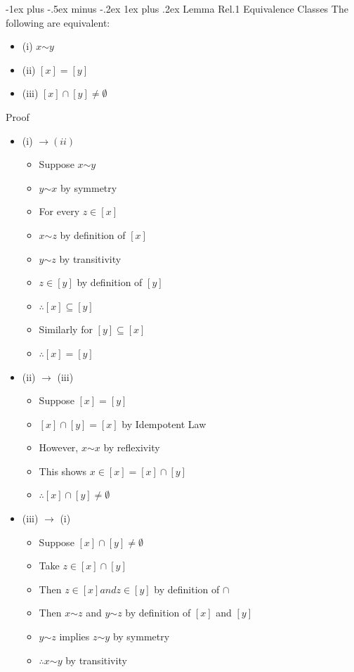 \documentclass[10pt, portrait]{article}
\makeatletter
\renewcommand{\subsection}{\@startsection{subsection}{3}{0mm}%
                                {-1ex plus -.5ex minus -.2ex}%
                                {1ex plus .2ex}%
                                {\normalfont\small\bfseries}}%
\renewcommand{\lnot}{\mathord{\sim}}
\makeatother
\begin{document}
\begin{multicols*}{2}
\subsection{Lemma Rel.1 Equivalence Classes}
The following are equivalent:
\begin{itemize}
    \item (i) $x \lnot y$
    \item (ii) $[x] = [y]$
    \item (iii) $[x] \cap [y] \neq \emptyset$
\end{itemize}
Proof
\begin{itemize}
    \item (i) $\rightarrow (ii)$
    \begin{itemize}
        \item Suppose $x \lnot y$
        \item $y \lnot x$ by symmetry
        \item For every $z \in [x]$
        \item $x \lnot z$ by definition of $[x]$
        \item $y \lnot z$ by transitivity
        \item $z \in [y]$ by definition of $[y]$
        \item $\therefore [x] \subseteq [y]$
        \item Similarly for $[y] \subseteq [x]$
        \item $\therefore [x] = [y]$
    \end{itemize}
    \item (ii) $\rightarrow$ (iii)
    \begin{itemize}
        \item Suppose $[x] = [y]$
        \item $[x] \cap [y] = [x]$ by Idempotent Law
        \item However, $x \lnot x$ by reflexivity
        \item This shows $x \in [x] = [x] \cap [y]$
        \item $\therefore [x] \cap [y] \neq \emptyset$
    \end{itemize}
    \item (iii) $\rightarrow$ (i)
    \begin{itemize}
        \item Suppose $[x] \cap [y] \neq \emptyset$
        \item Take $z \in [x] \cap [y]$
        \item Then $z \in [x] and z \in [y]$ by definition of $\cap$
        \item Then $x \lnot z$ and $y \lnot z$ by definition of $[x]$ and $[y]$
        \item $y \lnot z$ implies $z \lnot y$ by symmetry
        \item $\therefore x \lnot y$ by transitivity
    \end{itemize}
\end{itemize}


\end{multicols*}
\end{document}
